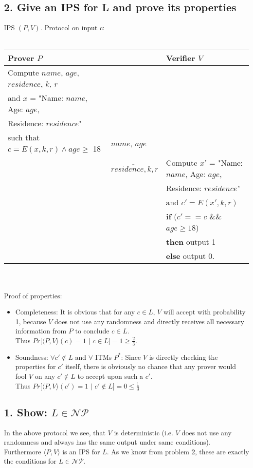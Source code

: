 \documentclass[12pt,pdftex,a4paper]{article}
\begin{document}
\subsection*{2. Give an IPS for L and prove its properties}
IPS $(P, V)$. Protocol on input c:
\\~\\
\footnotesize
\begin{tabular}{lll}
Prover $P$ && Verifier $V$\\
\hline
Compute $name$, $age$, $residence$, $k$, $r$ 
\\and $x$ = "Name: $name$, Age: $age$, \\
Residence: $residence$"\\
such that $c = E(x, k, r) \land age \geq$ 18 & $name$, $age$\\
&$\underrightarrow{residence, k, r}$ & Compute $x'$ = "Name: $name$, Age: $age$, \\
&& Residence: $residence$"\\
&& and $c' = E(x', k, r)$\\
&& \textbf{if} ($c' == c$ \&\& $age \geq 18$)\\
&& \textbf{then} output 1\\
&& \textbf{else} output 0.\\
\end{tabular}\\~\\
\normalsize
Proof of properties:
\begin{itemize}
\item Completeness: It is obvious that for any $c \in L$, $V$ will accept with probability 1, because $V$ does not use any randomness and directly receives all necessary information from $P$ to conclude $c\in L$.\\Thus $Pr[\langle P, V\rangle (c)=1$ $|$ $c\in L] = 1 \geq \frac{2}{3}$.
\item Soundness: $\forall c'\notin L$ and $\forall$ ITMs $P^*$: Since $V$ is directly checking the properties for $c'$ itself, there is obviously no chance that any prover would fool $V$ on any $c'\notin L$ to accept upon such a $c'$.\\Thus $Pr[\langle P, V\rangle (c') = 1$ $|$ $c'\notin L] = 0 \leq \frac{1}{3}$
\end{itemize}

\subsection*{1. Show: $L\in \mathcal{NP}$}
In the above protocol we see, that $V$ is deterministic (i.e. $V$ does not use any randomness and always has the same output under same conditions). Furthermore $\langle P, V \rangle$ is an IPS for $L$. As we know from problem 2, these are exactly the conditions for $L\in \mathcal{NP}$.
\end{document}
